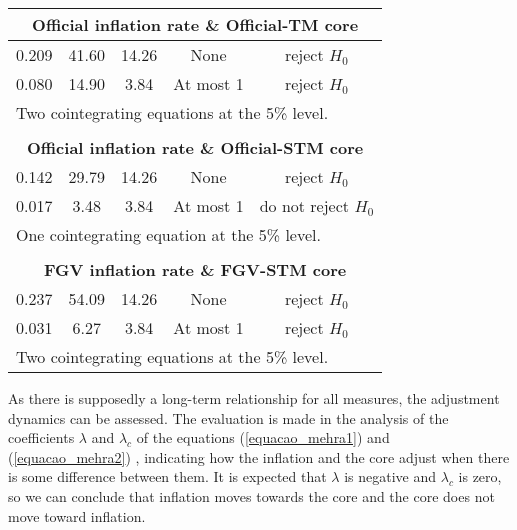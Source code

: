 \documentclass[10pt]{article}
\begin{document}
\begin{table}[]
\begin{tabular}{@{}ccccc@{}}
\multicolumn{5}{c}{\textbf{Official inflation rate \& Official-TM core}}          \\ \midrule
0.209 & 41.60 & 14.26 & None  & reject $H_0$      \\
0.080 & 14.90  & 3.84  & At most 1 & reject $H_0$  \\ \midrule
\multicolumn{5}{l}{\scriptsize{Two cointegrating equations at the 5\% level.}}\\ \\ \midrule

\multicolumn{5}{c}{\textbf{Official inflation rate \& Official-STM core}}          \\ \midrule
0.142 & 29.79 & 14.26 & None  & reject $H_0$      \\
0.017 & 3.48  & 3.84  & At most 1 & do not reject $H_0$  \\ \midrule
\multicolumn{5}{l}{\scriptsize{One cointegrating equation at the 5\% level.}}\\ \\ \midrule

\multicolumn{5}{c}{\textbf{FGV inflation rate \& FGV-STM core}}          \\ \midrule
0.237 & 54.09 & 14.26 & None  & reject $H_0$      \\
0.031 & 6.27  & 3.84  & At most 1 & reject $H_0$  \\ \midrule
\multicolumn{5}{l}{\scriptsize{Two cointegrating equations at the 5\% level.}}

\end{tabular}
\end{table}


As there is supposedly a long-term relationship for all measures, the adjustment dynamics can be assessed. The evaluation is made in the analysis of the coefficients $\lambda$ and $\lambda_c$ of the equations (\ref{equacao_mehra1}) and (\ref{equacao_mehra2}) \citep{mehra}, indicating how the  inflation and the core adjust when there is some difference between them. It is expected that $\lambda$ is negative and $\lambda_ {c}$ is zero, so we can conclude that inflation moves towards the core and the core does not move toward inflation.


\end{document}
